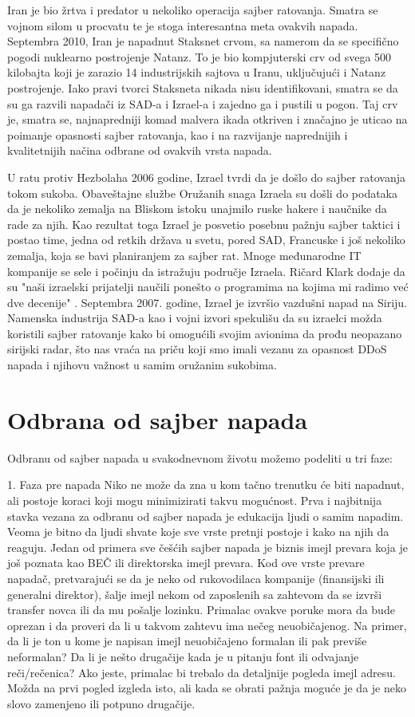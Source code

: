 \documentclass[a4paper]{article}
\begin{document}
{Iran je bio  žrtva i predator u nekoliko operacija sajber ratovanja. Smatra se vojnom silom u procvatu te je stoga interesantna meta ovakvih napada.
Septembra 2010, Iran je napadnut Staksnet crvom, sa namerom da se specifično pogodi nuklearno postrojenje Natanz. To je bio kompjuterski crv od svega 500 kilobajta koji je zarazio 14 industrijskih sajtova u Iranu, uključujući i Natanz postrojenje. Iako pravi tvorci Staksneta nikada nisu identifikovani, smatra se da su ga razvili napadači iz SAD-a i Izrael-a i zajedno ga i pustili u pogon. Taj crv je, smatra se, najnapredniji komad malvera ikada otkriven i značajno je uticao na poimanje opasnosti sajber ratovanja, kao i na razvijanje naprednijih i kvalitetnijih načina odbrane od ovakvih vrsta napada.

U ratu protiv Hezbolaha 2006 godine, Izrael tvrdi da je došlo do sajber ratovanja tokom sukoba. Obaveštajne službe Oružanih snaga Izraela su došli do podataka da je nekoliko zemalja na Bliskom istoku unajmilo ruske hakere i naučnike da rade za njih. Kao rezultat toga Izrael je posvetio posebnu pažnju sajber taktici i postao time, jedna od retkih država u svetu, pored SAD, Francuske i još nekoliko zemalja, koja se bavi planiranjem za sajber rat. Mnoge međunarodne IT kompanije se sele i počinju da istražuju područje Izraela. Ričard Klark dodaje da su "naši izraelski prijatelji naučili ponešto o programima na kojima mi radimo već dve decenije" .
Septembra 2007. godine, Izrael je izvršio vazdušni napad na Siriju. Namenska industrija SAD-a kao i vojni izvori spekulišu da su izraelci možda koristili sajber ratovanje kako bi omogućili svojim avionima da prođu neopazano sirijski radar, što nas vraća na priču koji smo imali vezanu za opasnost DDoS napada i njihovu važnost u samim oružanim sukobima.


\section{Odbrana od sajber napada}


Odbranu od sajber napada u svakodnevnom životu možemo podeliti u tri faze:

1. Faza pre napada
Niko ne može da zna u kom tačno trenutku će biti napadnut, ali postoje koraci koji mogu minimizirati takvu mogućnost. Prva i najbitnija stavka vezana za odbranu od sajber napada je edukacija ljudi o samim napadim. Veoma je bitno da ljudi shvate koje sve vrste pretnji postoje i kako na njih da reaguju.
Jedan od primera sve češćih sajber napada je biznis imejl prevara koja je još poznata kao BEČ ili direktorska imejl prevara. Kod ove vrste prevare napadač, pretvarajući se da je neko od rukovodilaca kompanije (finansijski ili generalni direktor), šalje imejl nekom od zaposlenih sa zahtevom da se izvrši transfer novca ili da mu pošalje lozinku. Primalac ovakve poruke mora da bude oprezan i da proveri da li u takvom zahtevu ima nečeg neuobičajenog. Na primer, da li je ton u kome je napisan imejl neuobičajeno formalan ili pak previše neformalan? Da li je nešto drugačije kada je u pitanju font ili odvajanje reči/rečenica? Ako jeste, primalac bi trebalo da detaljnije pogleda imejl adresu. Možda na prvi pogled izgleda isto, ali kada se obrati pažnja moguće je da je neko slovo zamenjeno ili potpuno drugačije.

}
\end{document}
